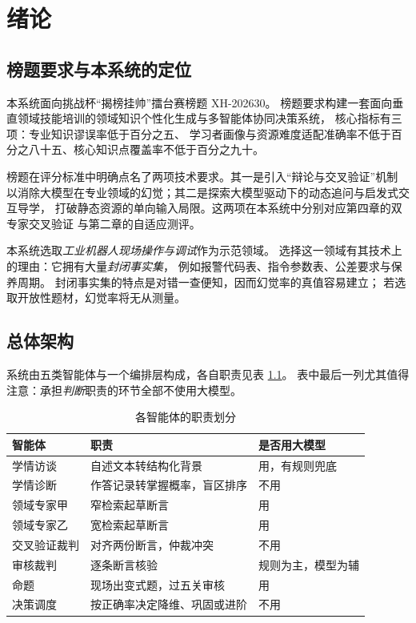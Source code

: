 \chapter{绪论}

\section{榜题要求与本系统的定位}

本系统面向挑战杯“揭榜挂帅”擂台赛榜题 XH-202630\cite{xh202630}。
榜题要求构建一套面向垂直领域技能培训的领域知识个性化生成与多智能体协同决策系统，
核心指标有三项：专业知识谬误率低于百分之五、
学习者画像与资源难度适配准确率不低于百分之八十五、核心知识点覆盖率不低于百分之九十。

榜题在评分标准中明确点名了两项技术要求。其一是引入“辩论与交叉验证”机制
以消除大模型在专业领域的幻觉；其二是探索大模型驱动下的动态追问与启发式交互导学，
打破静态资源的单向输入局限。这两项在本系统中分别对应第四章的双专家交叉验证
与第二章的自适应测评。

本系统选取\emph{工业机器人现场操作与调试}作为示范领域。
选择这一领域有其技术上的理由：它拥有大量\emph{封闭事实集}，
例如报警代码表、指令参数表、公差要求与保养周期。
封闭事实集的特点是对错一查便知，因而幻觉率的真值容易建立；
若选取开放性题材，幻觉率将无从测量。

\section{总体架构}

系统由五类智能体与一个编排层构成，各自职责见表 \ref{tab:agents}。
表中最后一列尤其值得注意：承担\emph{判断}职责的环节全部不使用大模型。

\begin{table}[htbp]\centering\small
\caption{各智能体的职责划分}\label{tab:agents}
\begin{tabular}{@{}p{2.2cm}p{6.4cm}p{2.4cm}@{}}
\toprule
智能体 & 职责 & 是否用大模型 \\
\midrule
学情访谈 & 自述文本转结构化背景 & 用，有规则兜底 \\
学情诊断 & 作答记录转掌握概率，盲区排序 & 不用 \\
领域专家甲 & 窄检索起草断言 & 用 \\
领域专家乙 & 宽检索起草断言 & 用 \\
交叉验证裁判 & 对齐两份断言，仲裁冲突 & 不用 \\
审核裁判 & 逐条断言核验 & 规则为主，模型为辅 \\
命题 & 现场出变式题，过五关审核 & 用 \\
决策调度 & 按正确率决定降维、巩固或进阶 & 不用 \\
\bottomrule
\end{tabular}
\end{table}

